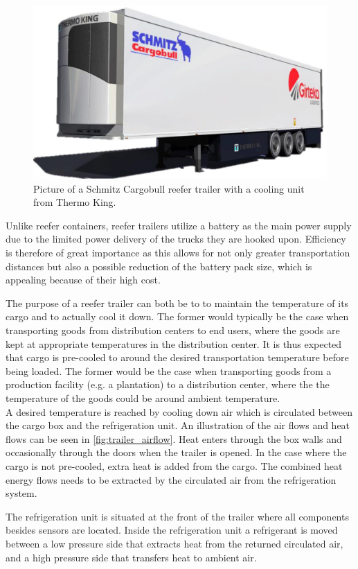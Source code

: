 \begin{figure}[h]
	\centering
	\includegraphics[width = 0.55\linewidth]{Graphics/3d_draw_trailer.jpg}
	\caption{Picture of a Schmitz Cargobull reefer trailer with a cooling unit from Thermo King.}
	\label{fig:trailer_picture}
\end{figure}

Unlike reefer containers, reefer trailers utilize a battery as the main power supply due to the limited power delivery of the trucks they are hooked upon. Efficiency is therefore of great importance as this allows for not only greater transportation distances but also a possible reduction of the battery pack size, which is appealing because of their high cost.

The purpose of a reefer trailer can both be to to maintain the temperature of its cargo and to actually cool it down. The former would typically be the case when transporting goods from distribution centers to end users, where the goods are kept at appropriate temperatures in the distribution center. It is thus expected that cargo is pre-cooled to around the desired transportation temperature before being loaded.
The former would be the case when transporting goods from a production facility (e.g. a plantation) to a distribution center, where the the temperature of the goods could be around ambient temperature.\\

A desired temperature is reached by cooling down air which is circulated between the cargo box and the refrigeration unit. An illustration of the air flows and heat flows can be seen in \cref{fig:trailer_airflow}. Heat enters through the box walls and occasionally through the doors when the trailer is opened. In the case where the cargo is not pre-cooled, extra heat is added from the cargo. The combined heat energy flows needs to be extracted by the circulated air from the refrigeration system. 

The refrigeration unit is situated at the front of the trailer where all components besides sensors are located. Inside the refrigeration unit a refrigerant is moved between a low pressure side that extracts heat from the returned circulated air, and a high pressure side that transfers heat to ambient air. 

